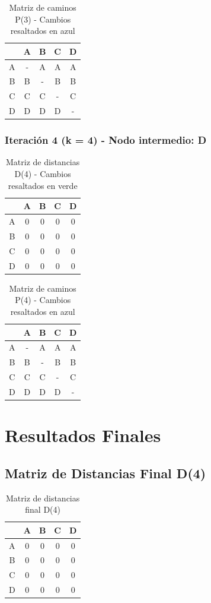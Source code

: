 \documentclass[12pt]{article}
\begin{document}
\begin{table}[h!]
\centering
\begin{tabular}{|c|c|c|c|c|}
\hline
 & A & B & C & D \\\hline
A & - & A & A & A \\\hline
B & B & - & B & B \\\hline
C & C & C & - & C \\\hline
D & D & D & D & - \\\hline
\end{tabular}
\caption{Matriz de caminos P(3) - Cambios resaltados en azul}
\end{table}

\clearpage
\subsubsection{Iteración 4 (k = 4) - Nodo intermedio: D}
\begin{table}[h!]
\centering
\begin{tabular}{|c|c|c|c|c|}
\hline
 & A & B & C & D \\\hline
A & 0 & 0 & 0 & 0 \\\hline
B & 0 & 0 & 0 & 0 \\\hline
C & 0 & 0 & 0 & 0 \\\hline
D & 0 & 0 & 0 & 0 \\\hline
\end{tabular}
\caption{Matriz de distancias D(4) - Cambios resaltados en verde}
\end{table}

\begin{table}[h!]
\centering
\begin{tabular}{|c|c|c|c|c|}
\hline
 & A & B & C & D \\\hline
A & - & A & A & A \\\hline
B & B & - & B & B \\\hline
C & C & C & - & C \\\hline
D & D & D & D & - \\\hline
\end{tabular}
\caption{Matriz de caminos P(4) - Cambios resaltados en azul}
\end{table}

\clearpage
\section{Resultados Finales}
\subsection{Matriz de Distancias Final D(4)}
\begin{table}[h!]
\centering
\begin{tabular}{|c|c|c|c|c|}
\hline
 & A & B & C & D \\\hline
A & 0 & 0 & 0 & 0 \\\hline
B & 0 & 0 & 0 & 0 \\\hline
C & 0 & 0 & 0 & 0 \\\hline
D & 0 & 0 & 0 & 0 \\\hline
\end{tabular}
\caption{Matriz de distancias final D(4)}
\end{table}
\end{document}
